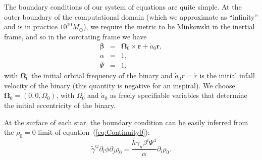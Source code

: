 The boundary conditions of our system of equations are quite
simple. At the outer boundary of the computational domain (which we
approximate as ``infinity'' and is in practice $10^{10}M_{\odot}$), we require the metric to be Minkowski
in the inertial frame, and so in the corotating frame we have
\begin{eqnarray}
{\bm \beta} &=& {\bm \Omega}_0 \times {\bm r} + \dot a_0 {\bm
  r},\\ \alpha &=& 1,\\ \Psi &=& 1,
\end{eqnarray}
with ${\bm \Omega}_0$ the initial orbital frequency of the binary and
$\dot{a}_0r=\dot{r}$ is the initial infall velocity of the binary (this quantity is negative for an inspiral).
We choose ${\bm
  \Omega}_0=(0,0,\Omega_0)$, with $\Omega_0$ and $\dot{a}_0$ as freely
specifiable variables that determine the initial eccentricity of the
binary.

At the surface of each star, the boundary condition can be easily
inferred from the $\rho_0=0$ limit of equation~(\ref{eq:Continuity0}):
\begin{equation}
\tilde{\gamma}^{ij}\partial_i\phi\partial_j\rho_0 =
\frac{h\gamma_n\beta^{i}\Psi^4}{\alpha}\partial_i\rho_0.
\end{equation}


